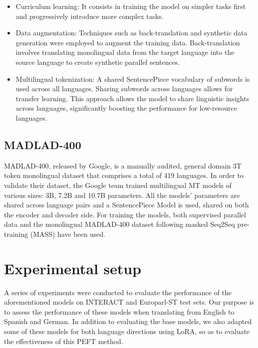 \documentclass[11pt,english,listoffigures,listoftables]{tfgetsinf}
\begin{document}
\begin{itemize}
    \item Curriculum learning: It consists in training the model on simpler tasks first and progressively introduce more complex tasks.

    \item Data augmentation: Techniques such as back-translation and synthetic data generation were employed to augment the training data. Back-translation involves translating monolingual data from the target language into the source language to create synthetic parallel sentences.

    \item Multilingual tokenization: A shared SentencePiece vocabulary of subwords is used across all languages. Sharing subwords across languages allows for transfer learning. This approach allows the model to share linguistic insights across languages, significantly boosting the performance for low-resource languages.
\end{itemize}

\subsection{MADLAD-400}

MADLAD-400, released by Google, is a manually audited, general domain 3T token monolingual dataset that comprises a total of 419 languages. In order to validate their dataset, the Google team trained multilingual MT models of various sizes: 3B, 7.2B and 10.7B parameters. All the models' parameters are shared across language pairs and a SentencePiece Model is used, shared on both the encoder and decoder side. For training the models, both supervised parallel data and the monolingual MADLAD-400 dataset following masked Seq2Seq pre-training (MASS) \cite{song2019mass} have been used.

\section{Experimental setup}

A series of experiments were conducted to evaluate the performance of the aforementioned models on INTERACT and Europarl-ST test sets. Our purpose is to assess the performance of these models when translating from English to Spanish and German. In addition to evaluating the base models, we also adapted some of these models for both language directions using LoRA, so as to evaluate the effectiveness of this PEFT method. 
\end{document}
